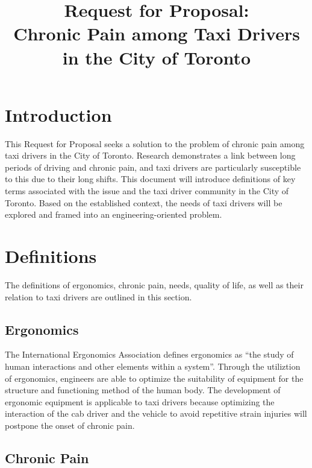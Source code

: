 \documentclass[11pt]{article}
\begin{document}
\title{Request for Proposal: \\Chronic Pain among Taxi Drivers in the
  City of Toronto}
\maketitle
\begin{abstract}

\end{abstract}
\tableofcontents
\section{Introduction}
\label{sec:intro}
This Request for Proposal seeks a solution to the problem of chronic
pain among taxi drivers in the City of Toronto. Research demonstrates a
link between long periods of driving and chronic pain\cite{KneePain,
Okunribido2008}, and taxi drivers are particularly susceptible to this
due to their long shifts\cite{thestar2012, KneePain}. This document will introduce
definitions of key terms associated with the issue and the taxi driver community
in the City of Toronto. Based on the established context, the needs of taxi drivers
will be explored and framed into an engineering-oriented problem. 

\section{Definitions}
\label{sec:defs}
The definitions of ergonomics, chronic pain, needs, quality of life, as
well as their relation to taxi drivers are outlined in this section.

\subsection{Ergonomics}
\label{sec:ergonomics}

The International Ergonomics Association defines ergonomics as “the
study of human interactions and other elements within a system”\cite{ergo}. 
Through the utiliztion of ergonomics, engineers are able to optimize the suitability
of equipment for the structure and functioning method of the human
body. The development of ergonomic equipment is applicable to
taxi drivers because optimizing the interaction of the cab driver
and the vehicle to avoid repetitive strain injuries will postpone
the onset of chronic pain. 

\subsection{Chronic Pain}
\label{sec:pain}
\end{document}
